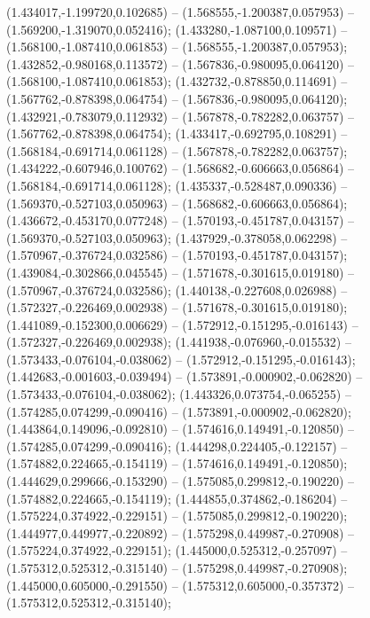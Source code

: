  (1.434017,-1.199720,0.102685) -- (1.568555,-1.200387,0.057953) -- (1.569200,-1.319070,0.052416);
 (1.433280,-1.087100,0.109571) -- (1.568100,-1.087410,0.061853) -- (1.568555,-1.200387,0.057953);
 (1.432852,-0.980168,0.113572) -- (1.567836,-0.980095,0.064120) -- (1.568100,-1.087410,0.061853);
 (1.432732,-0.878850,0.114691) -- (1.567762,-0.878398,0.064754) -- (1.567836,-0.980095,0.064120);
 (1.432921,-0.783079,0.112932) -- (1.567878,-0.782282,0.063757) -- (1.567762,-0.878398,0.064754);
 (1.433417,-0.692795,0.108291) -- (1.568184,-0.691714,0.061128) -- (1.567878,-0.782282,0.063757);
 (1.434222,-0.607946,0.100762) -- (1.568682,-0.606663,0.056864) -- (1.568184,-0.691714,0.061128);
 (1.435337,-0.528487,0.090336) -- (1.569370,-0.527103,0.050963) -- (1.568682,-0.606663,0.056864);
 (1.436672,-0.453170,0.077248) -- (1.570193,-0.451787,0.043157) -- (1.569370,-0.527103,0.050963);
 (1.437929,-0.378058,0.062298) -- (1.570967,-0.376724,0.032586) -- (1.570193,-0.451787,0.043157);
 (1.439084,-0.302866,0.045545) -- (1.571678,-0.301615,0.019180) -- (1.570967,-0.376724,0.032586);
 (1.440138,-0.227608,0.026988) -- (1.572327,-0.226469,0.002938) -- (1.571678,-0.301615,0.019180);
 (1.441089,-0.152300,0.006629) -- (1.572912,-0.151295,-0.016143) -- (1.572327,-0.226469,0.002938);
 (1.441938,-0.076960,-0.015532) -- (1.573433,-0.076104,-0.038062) -- (1.572912,-0.151295,-0.016143);
 (1.442683,-0.001603,-0.039494) -- (1.573891,-0.000902,-0.062820) -- (1.573433,-0.076104,-0.038062);
 (1.443326,0.073754,-0.065255) -- (1.574285,0.074299,-0.090416) -- (1.573891,-0.000902,-0.062820);
 (1.443864,0.149096,-0.092810) -- (1.574616,0.149491,-0.120850) -- (1.574285,0.074299,-0.090416);
 (1.444298,0.224405,-0.122157) -- (1.574882,0.224665,-0.154119) -- (1.574616,0.149491,-0.120850);
 (1.444629,0.299666,-0.153290) -- (1.575085,0.299812,-0.190220) -- (1.574882,0.224665,-0.154119);
 (1.444855,0.374862,-0.186204) -- (1.575224,0.374922,-0.229151) -- (1.575085,0.299812,-0.190220);
 (1.444977,0.449977,-0.220892) -- (1.575298,0.449987,-0.270908) -- (1.575224,0.374922,-0.229151);
 (1.445000,0.525312,-0.257097) -- (1.575312,0.525312,-0.315140) -- (1.575298,0.449987,-0.270908);
 (1.445000,0.605000,-0.291550) -- (1.575312,0.605000,-0.357372) -- (1.575312,0.525312,-0.315140);
